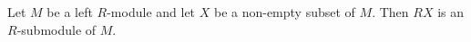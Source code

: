 Let $M$ be a left $R$-module and let $X$ be a non-empty subset of $M$. Then $RX$ is an $R$-submodule of $M$.
